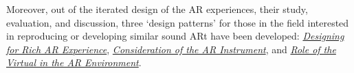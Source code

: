 \begin{SingleSpace}
    Moreover, out of the iterated design of the AR experiences, their study, evaluation, and discussion, three `design patterns' for those in the field interested in reproducing or developing similar sound ARt have been developed: \textit{\href{https://thexrt.space/design-patterns/rich-ar}{Designing for Rich AR Experience}}, \textit{\href{https://thexrt.space/design-patterns/ar-instrument}{Consideration of the AR Instrument}}, and \textit{\href{https://thexrt.space/design-patterns/virtual-role}{Role of the Virtual in the AR Environment}}.   
\end{SingleSpace}
